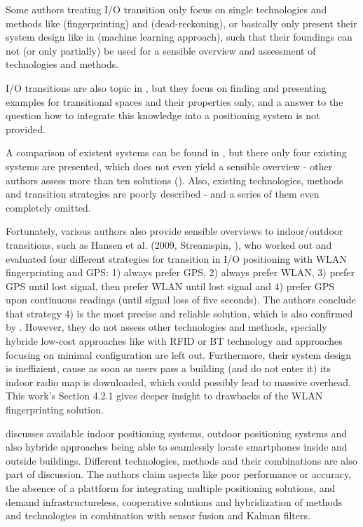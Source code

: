 Some authors treating I/O transition only focus on single technologies and methods like \cite{indoorFingerprinting} (fingerprinting) and \cite{drear} (dead-reckoning), or basically only present their system design like in \cite{machineLearningIO} (machine learning approach), such that their foundings can not (or only partially) be used for a sensible overview and assessment of technologies and methods.

I/O transitions are also topic in \cite{transitionalSpaces}, but they focus on finding and presenting examples for transitional spaces and their properties only, and a answer to the question how to integrate this knowledge into a positioning system is not provided.

A comparison of existent systems can be found in \cite{seamlessIOresearch}, but there only four existing systems are presented, which does not even yield a sensible overview - other authors assess more than ten solutions (\cite{seamlessIOsolutions}). Also, existing technologies, methods and transition strategies are poorly described - and a series of them even completely omitted.

Fortunately, various authors also provide sensible overviews to indoor/outdoor transitions, such as Hansen et al. (2009, Streamspin, \cite{streamspin}), who worked out and evaluated four different strategies for transition in I/O positioning with WLAN fingerprinting and GPS: 1) always prefer GPS, 2) always prefer WLAN, 3) prefer GPS until lost signal, then prefer WLAN until lost signal and 4) prefer GPS upon continuous readings (until signal loss of five seconds).
The authors conclude that strategy 4) is the most precise and reliable solution, which is also confirmed by \cite{seamlessIOresearch}.
However, they do not assess other technologies and methods, specially hybride low-cost approaches like with RFID or BT technology and approaches focusing on minimal configuration are left out. Furthermore, their system design is ineffizient, cause as soon as users pass a building (and do not enter it) its indoor radio map is downloaded, which could possibly lead to massive overhead.
This work's Section 4.2.1 gives deeper insight to drawbacks of the WLAN fingerprinting solution.

\cite{seamlessIOsolutions} discusses available indoor positioning systems, outdoor positioning systems and also hybride approaches being able to seamlessly locate smartphones inside and outside buildings. Different technologies, methods and their combinations are also part of discussion.
The authors claim aspects like poor performance or accuracy, the absence of a plattform for integrating multiple positioning solutions, and demand infrastructureless, cooperative solutions and hybridization of methods and technologies in combination with sensor fusion and Kalman filters.

